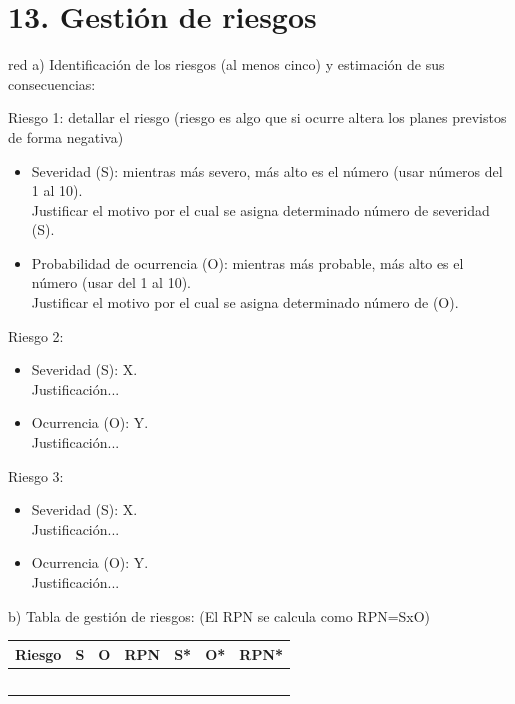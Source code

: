 \section{13. Gestión de riesgos}
\label{sec:riesgos}

\begin{consigna}{red}
a) Identificación de los riesgos (al menos cinco) y estimación de sus consecuencias:
 
Riesgo 1: detallar el riesgo (riesgo es algo que si ocurre altera los planes previstos de forma negativa)
\begin{itemize}
	\item Severidad (S): mientras más severo, más alto es el número (usar números del 1 al 10).\\
	Justificar el motivo por el cual se asigna determinado número de severidad (S).
	\item Probabilidad de ocurrencia (O): mientras más probable, más alto es el número (usar del 1 al 10).\\
	Justificar el motivo por el cual se asigna determinado número de (O). 
\end{itemize}   

Riesgo 2:
\begin{itemize}
	\item Severidad (S): X.\\
	Justificación...
	\item Ocurrencia (O): Y.\\
	Justificación...
\end{itemize}

Riesgo 3:
\begin{itemize}
	\item Severidad (S):  X.\\
	Justificación...
	\item Ocurrencia (O): Y.\\
	Justificación...
\end{itemize}


b) Tabla de gestión de riesgos:      (El RPN se calcula como RPN=SxO)

\begin{table}[htpb]
\centering
\begin{tabularx}{\linewidth}{@{}|X|c|c|c|c|c|c|@{}}
\hline
\rowcolor[HTML]{C0C0C0} 
Riesgo & S & O & RPN & S* & O* & RPN* \\ \hline
       &   &   &     &    &    &      \\ \hline
       &   &   &     &    &    &      \\ \hline
       &   &   &     &    &    &      \\ \hline
       &   &   &     &    &    &      \\ \hline
       &   &   &     &    &    &      \\ \hline
\end{tabularx}%
\end{table}


\end{consigna}
